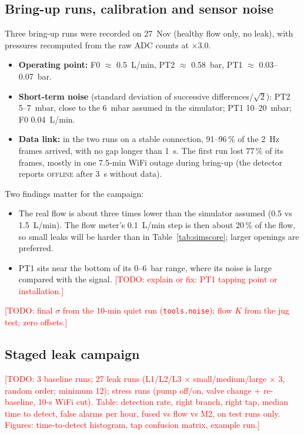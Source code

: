 \documentclass[conference]{IEEEtran}
\newcommand{\TODO}[1]{\textcolor{red}{[TODO: #1]}}
\begin{document}
\subsection{Bring-up runs, calibration and sensor noise}
Three bring-up runs were recorded on 27~Nov (healthy flow only, no leak), with pressures
recomputed from the raw ADC counts at $\times 3.0$.
\begin{itemize}
\item \textbf{Operating point:} F0 $\approx$ 0.5~L/min, PT2 $\approx$ 0.58~bar,
  PT1 $\approx$ 0.03--0.07~bar.
\item \textbf{Short-term noise} (standard deviation of successive differences$/\sqrt 2$):
  PT2 5--7~mbar, close to the 6~mbar assumed in the simulator; PT1 10--20~mbar; F0 0.04~L/min.
\item \textbf{Data link:} in the two runs on a stable connection, 91--96\,\% of the 2~Hz frames
  arrived, with no gap longer than 1~s. The first run lost 77\,\% of its frames, mostly in one
  7.5-min WiFi outage during bring-up (the detector reports \textsc{offline} after 3~s without
  data).
\end{itemize}
Two findings matter for the campaign:
\begin{itemize}
\item The real flow is about three times lower than the simulator assumed (0.5 vs 1.5~L/min).
  The flow meter's 0.1~L/min step is then about 20\,\% of the flow, so small leaks will be harder
  than in Table~\ref{tab:simscore}; larger openings are preferred.
\item PT1 sits near the bottom of its 0--6~bar range, where its noise is large compared with the
  signal. \TODO{explain or fix: PT1 tapping point or installation.}
\end{itemize}
\TODO{final $\sigma$ from the 10-min quiet run (\texttt{tools.noise}); flow $K$ from the jug
test; zero offsets.}

\subsection{Staged leak campaign}
\TODO{3 baseline runs; 27 leak runs (L1/L2/L3 $\times$ small/medium/large $\times$ 3, random
order; minimum 12); stress runs (pump off/on, valve change + re-baseline, 10-s WiFi cut). Table:
detection rate, right branch, right tap, median time to detect, false alarms per hour, fused vs
flow vs M2, on test runs only. Figures: time-to-detect histogram, tap confusion matrix, example
run.}
\end{document}
